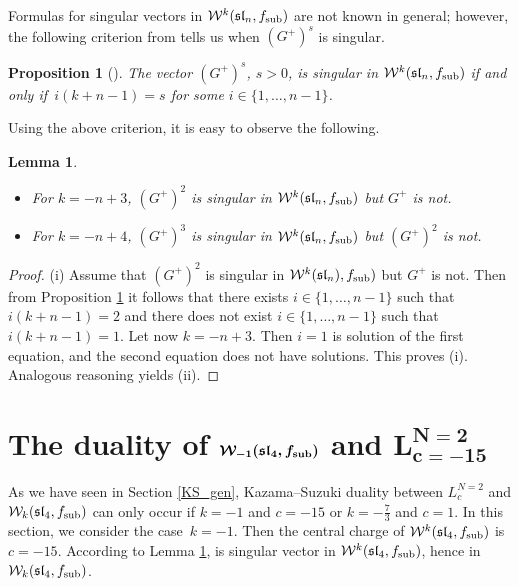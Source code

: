 \documentclass[11pt]{article}
\numberwithin{equation}{section}
\newtheorem{Lemma}[Theorem]{Lemma}
\newtheorem{Proposition}[Theorem]{Proposition}
\begin{document}
	Formulas for singular vectors in $\mathcal{W}^k(\mathfrak{sl}_n, f_{\rm sub})$ are not known in general; however, the following criterion from \cite{Feh} tells us when $(G^+)^s$ is singular.
	
	\begin{Proposition}[\cite{Feh}]\label{kriterij}
		The vector $(G^+)^s$, $s>0$, is singular in $\mathcal{W}^k(\mathfrak{sl}_n, f_{\rm sub})$ if and only if~${
		 	i(k+n-1)=s}
$
 for some $i \in \{1,\dots ,n-1 \}$.
	\end{Proposition}

Using the above criterion, it is easy to observe the following.
	\begin{Lemma} \label{sing_G^+}\qquad
	\begin{itemize}\itemsep=0pt
		\item[$(i)$] For $k=-n+3$, $(G^+)^2$ is singular in $\mathcal{W}^k(\mathfrak{sl}_n, f_{\rm sub})$ but $G^+$ is not.
		\item[$(ii)$] For $k=-n+4$, $(G^+)^3$ is singular in $\mathcal{W}^k(\mathfrak{sl}_n, f_{\rm sub})$ but $(G^+)^2$ is not.	
	\end{itemize}
	\end{Lemma}
	
	\begin{proof}
		(i) Assume that $(G^+)^2$ is singular in $\mathcal{W}^k(\mathfrak{sl}_n), f_{\rm sub})$ but $G^+$ is not. Then from Proposition \ref{kriterij} it follows that there exists $i \in \{1,\dots ,n-1 \}$ such that $ i(k+n-1)=2 $ and there does not exist $i \in \{1,\dots ,n-1 \}$ such that $ i(k+n-1)=1$. Let now $k=-n+3$. Then $i=1$ is solution of the first equation, and the second equation does not have solutions. This proves (i).
		Analogous reasoning yields (ii).
	\end{proof}

\setcounter{section}{3}
\section[The duality of W\_-1(sl\_4, f\_sub) and L\^{}N=2\_c=-15]{The duality of $\boldsymbol{\mathcal{W}_{-1}(\mathfrak{sl}_4, f_{\rm sub})}$ and $\boldsymbol{L^{N=2}_{c=-15}}$} \label{duality}


As we have seen in Section \ref{KS_gen}, Kazama--Suzuki duality between $L^{N=2}_c$ and $\mathcal W_k(\mathfrak{sl}_4, f_{\rm sub})$ can only occur if $k=-1$ and $c=-15$ or $k=-\frac{7}{3}$ and $c=1$.
In this section, we consider the case~${k=-1}$. Then the central charge of $\mathcal{W}^{k}(\mathfrak{sl}_4, f_{\rm sub})$ is $c = -15$. According to Lemma \ref{sing_G^+},  is singular vector in $\mathcal{W}^{k}(\mathfrak{sl}_4, f_{\rm sub})$, hence  in $\mathcal{W}_{k}(\mathfrak{sl}_4, f_{\rm sub})$.
\end{document}
